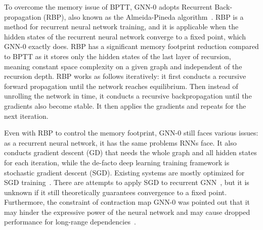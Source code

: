 To overcome the memory issue of BPTT, GNN-0 adopts Recurrent Back-propagation (RBP), also known as the Almeida-Pineda algorithm~\cite{almeida, pineda}. RBP is a method for recurrent neural network training, and it is applicable when the hidden states of the recurrent neural network converge to a fixed point, which GNN-0 exactly does. RBP has a significant memory footprint reduction compared to BPTT as it stores only the hidden states of the last layer of recursion, meaning constant space complexity on a given graph and independent of the recursion depth. RBP works as follows iteratively: it first conducts a recursive forward propagation until the network reaches equilibrium. Then instead of unrolling the network in time, it conducts a recursive backpropagation until the gradients also become stable. It then applies the gradients and repeats for the next iteration.

Even with RBP to control the memory footprint, GNN-0 still faces various issues: as a recurrent neural network, it has the same problems RNNs face. It also conducts gradient descent (GD) that needs the whole graph and all hidden states for each iteration, while the de-facto deep learning training framework is stochastic gradient descent (SGD). Existing systems are mostly optimized for SGD training~\cite{cerebro, tf, torch, horovod}. There are attempts to apply SGD to recurrent GNN~\cite{sse}, but it is unknown if it still theoretically guarantees convergence to a fixed point. Furthermore, the constraint of contraction map GNN-0 was pointed out that it may hinder the expressive power of the neural network and may cause dropped performance for long-range dependencies~\cite{ggnn}.

